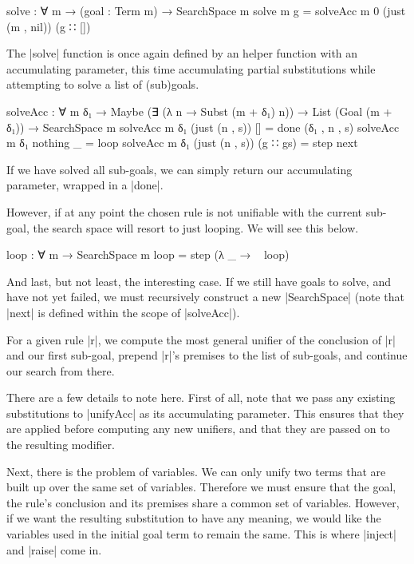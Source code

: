 \documentclass[preprint]{sigplanconf}
\begin{document}
\begin{code}
  solve : ∀ {m} → (goal : Term m) → SearchSpace m
  solve {m} g = solveAcc {m} {0} (just (m , nil)) (g ∷ [])
\end{code}

The |solve| function is once again defined by an helper function with
an accumulating parameter, this time accumulating partial
substitutions while attempting to solve a list of (sub)goals.

\begin{code}
  solveAcc  : ∀ {m δ₁} → Maybe (∃ (λ n → Subst (m + δ₁) n))
            → List (Goal (m + δ₁)) → SearchSpace m
  solveAcc {m} {δ₁}  (just (n , s))  []        = done (δ₁ , n , s)
  solveAcc {m} {δ₁}  nothing         _         = loop
  solveAcc {m} {δ₁}  (just (n , s))  (g ∷ gs)  = step next
\end{code}

If we have solved all sub-goals, we can simply return our
accumulating parameter, wrapped in a |done|.

However, if at any point the chosen rule is not unifiable with the
current sub-goal, the search space will resort to just looping. We will
see this below.

\begin{code}
  loop : ∀ {m} → SearchSpace m
  loop = step (λ _ → ~ loop)
\end{code}

And last, but not least, the interesting case. If we still have goals
to solve, and have not yet failed, we must recursively construct a new
|SearchSpace| (note that |next| is defined within the scope of
|solveAcc|).

For a given rule |r|, we compute the most general unifier of the
conclusion of |r| and our first sub-goal, prepend |r|'s premises to
the list of sub-goals, and continue our search from there.

There are a few details to note here.
First of all, note that we pass any existing substitutions to
|unifyAcc| as its accumulating parameter. This ensures that they are
applied before computing any new unifiers, and that they are passed on
to the resulting modifier.

Next, there is the problem of variables. We can only unify two terms
that are built up over the same set of variables. Therefore we must
ensure that the goal, the rule's conclusion and its premises share a
common set of variables.
However, if we want the resulting substitution to have any meaning, we
would like the variables used in the initial goal term to remain the
same. This is where |inject| and |raise| come in.
\end{document}
